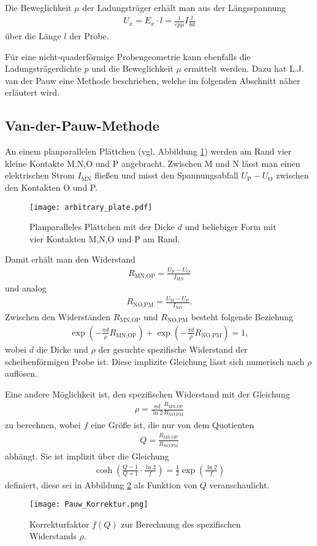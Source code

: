 \newpage
Die Beweglichkeit $\mu$ der Ladungsträger erhält man aus der Längsspannung
\begin{align}
U_x=E_x\cdot l=\frac{1}{ep\mu}I\frac{l}{bd}
\end{align}
über die Länge $l$ der Probe.

Für eine nicht-quaderförmige Probengeometrie kann ebenfalls die Ladungsträgerdichte $p$ und die Beweglichkeit $\mu$ ermittelt werden. Dazu hat L.J. van der Pauw eine Methode beschrieben, welche im folgenden Abschnitt näher erläutert wird.
\subsection{Van-der-Pauw-Methode}
An einem planparallelen Plättchen (vgl. Abbildung \ref{fig:vdP}) werden am Rand vier kleine Kontakte M,N,O und P angebracht. Zwischen M und N lässt man einen elektrischen Strom $I_\text{MN}$ fließen und misst den Spannungsabfall $U_\text{P}-U_\text{O}$ zwischen den Kontakten O und P.
\begin{figure}[h]
\centering
\texttt{[image: arbitrary\_plate.pdf]}
\caption{Planparalleles Plättchen mit der Dicke $d$ und beliebiger Form mit vier Kontakten M,N,O und P am Rand.}
\label{fig:vdP}
\end{figure}

 Damit erhält man den Widerstand
\begin{align}
R_\text{MN,OP}=\frac{U_\text{P}-U_\text{O}}{I_\text{MN}}
\end{align}
und analog
\begin{align}
R_\text{NO,PM}=\frac{U_\text{M}-U_\text{P}}{I_\text{NO}}.
\end{align}
Zwischen den Widerständen $R_\text{MN,OP}$ und $R_\text{NO,PM}$ besteht folgende Beziehung
\begin{align}
\exp\left(-\frac{\pi d}{\rho}R_\text{MN,OP}\right)+\exp\left(-\frac{\pi d}{\rho}R_\text{NO,PM}\right)=1,
\end{align}
wobei $d$ die Dicke und $\rho$ der gesuchte spezifische Widerstand der scheibenförmigen Probe ist. Diese implizite Gleichung lässt sich numerisch nach $\rho$ auflösen.

Eine andere Möglichkeit ist, den spezifischen Widerstand mit der Gleichung 
\begin{align}
\rho=\frac{\pi d}{\ln 2}\frac{R_\text{MN,OP}}{R_\text{NO,PM}}
\end{align}
zu berechnen, wobei $f$ eine Größe ist, die nur von dem Quotienten
\begin{align}
Q=\frac{R_\text{MN,OP}}{R_\text{NO,PM}}
\end{align}
abhängt. Sie ist implizit über die Gleichung
\begin{align}
\cosh\left(\frac{Q-1}{Q+1}\cdot\frac{\ln 2}{f}\right)=\frac{1}{2}\exp\left(\frac{\ln 2}{f}\right)
\end{align}
definiert, diese sei in Abbildung \ref{fig:f(Q)} als Funktion von $Q$ veranschaulicht.
\begin{figure}[h]
\centering
\texttt{[image: Pauw\_Korrektur.png]}
\caption{Korrekturfaktor $f(Q)$ zur Berechnung des spezifischen Widerstands $\rho$. \cite{lit:Wiki1}}
\label{fig:f(Q)}
\end{figure}

